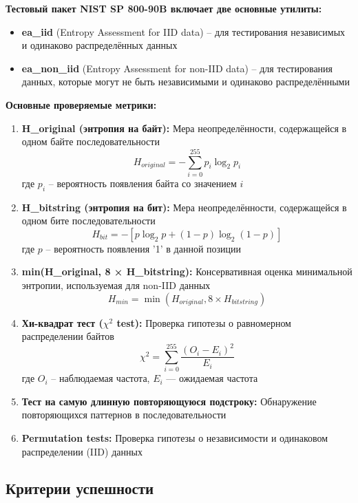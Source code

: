 \documentclass[14pt, a4paper]{extreport}
\begin{document}
\textbf{Тестовый пакет NIST SP 800-90B включает две основные утилиты:}
\begin{itemize}
    \item \textbf{ea\_iid} (Entropy Assessment for IID data) -- для тестирования независимых и одинаково распределённых данных
    \item \textbf{ea\_non\_iid} (Entropy Assessment for non-IID data) -- для тестирования данных, которые могут не быть независимыми и одинаково распределёнными
\end{itemize}

\textbf{Основные проверяемые метрики:}
\begin{enumerate}
    \item \textbf{H\_original (энтропия на байт):} Мера неопределённости, содержащейся в одном байте последовательности
    $$H_{original} = -\sum_{i=0}^{255} p_i \log_2 p_i$$
    где $p_i$ -- вероятность появления байта со значением $i$
    
    \item \textbf{H\_bitstring (энтропия на бит):} Мера неопределённости, содержащейся в одном бите последовательности
    $$H_{bit} = -[p \log_2 p + (1-p) \log_2 (1-p)]$$
    где $p$ -- вероятность появления '1' в данной позиции
    
    \item \textbf{min(H\_original, 8 × H\_bitstring):} Консервативная оценка минимальной энтропии, используемая для non-IID данных
    $$H_{min} = \min(H_{original}, 8 \times H_{bitstring})$$
    
    \item \textbf{Хи-квадрат тест ($\chi^2$ test):} Проверка гипотезы о равномерном распределении байтов
    $$\chi^2 = \sum_{i=0}^{255} \frac{(O_i - E_i)^2}{E_i}$$
    где $O_i$ -- наблюдаемая частота, $E_i$ --- ожидаемая частота
    
    \item \textbf{Тест на самую длинную повторяющуюся подстроку:} Обнаружение повторяющихся паттернов в последовательности
    
    \item \textbf{Permutation tests:} Проверка гипотезы о независимости и одинаковом распределении (IID) данных
\end{enumerate}

\subsection{Критерии успешности}
\end{document}
